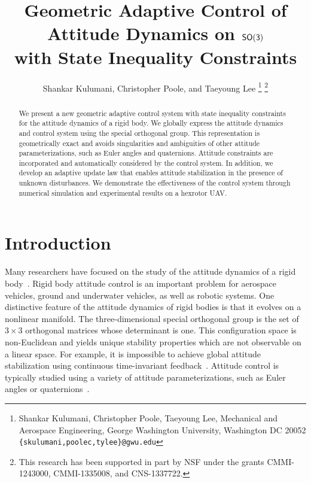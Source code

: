 \documentclass[letterpaper, 10 pt, conference]{ieeeconf}  %
\title{\LARGE \bf
Geometric Adaptive Control of Attitude Dynamics on $\mathsf{SO(3)}$\\ with State Inequality Constraints}
\author{Shankar Kulumani, Christopher Poole, and Taeyoung Lee
\thanks{Shankar Kulumani, Christopher Poole, Taeyoung Lee, Mechanical and Aerospace Engineering, George Washington University, Washington DC 20052 {\tt \{skulumani,poolec,tylee\}@gwu.edu}}
\thanks{This research has been supported in part by NSF under the grants CMMI-1243000, CMMI-1335008, and CNS-1337722.}
}
\begin{document}
\maketitle
\thispagestyle{empty}
\pagestyle{empty}


\begin{abstract}
We present a new geometric adaptive control system with state inequality constraints for the attitude dynamics of a rigid body.
We globally express the attitude dynamics and control system using the special orthogonal group. 
This representation is geometrically exact and avoids singularities and ambiguities of other attitude parameterizations, such as Euler angles and quaternions.
Attitude constraints are incorporated and automatically considered by the control system.
In addition, we develop an adaptive update law that enables attitude stabilization in the presence of unknown disturbances. 
We demonstrate the effectiveness of the control system through numerical simulation and experimental results on a hexrotor UAV.

\end{abstract}


\section{Introduction}\label{sec:intro}
Many researchers have focused on the study of the attitude dynamics of a rigid body~\cite{hughes2004,wertz1978}.
Rigid body attitude control is an important problem for aerospace vehicles, ground and underwater vehicles, as well as robotic systems.
One distinctive feature of the attitude dynamics of rigid bodies is that it evolves on a nonlinear manifold.
The three-dimensional special orthogonal group is the set of \( 3 \times 3 \) orthogonal matrices whose determinant is one.
This configuration space is non-Euclidean and yields unique stability properties which are not observable on a linear space.
For example, it is impossible to achieve global attitude stabilization using continuous time-invariant feedback~\cite{bhat2000}.
Attitude control is typically studied using a variety of attitude parameterizations, such as Euler angles or quaternions~\cite{shuster1993}.

\end{document}
